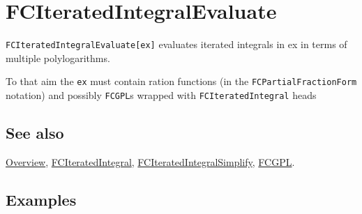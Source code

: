 \documentclass[../FeynCalcManual.tex]{subfiles}
\begin{document}
\begin{Shaded}
\begin{Highlighting}[]
 
\end{Highlighting}
\end{Shaded}

\hypertarget{fciteratedintegralevaluate}{
\section{FCIteratedIntegralEvaluate}\label{fciteratedintegralevaluate}}

\texttt{FCIteratedIntegralEvaluate[\allowbreak{}ex]} evaluates iterated
integrals in ex in terms of multiple polylogarithms.

To that aim the \texttt{ex} must contain ration functions (in the
\texttt{FCPartialFractionForm} notation) and possibly \texttt{FCGPL}s
wrapped with \texttt{FCIteratedIntegral} heads

\subsection{See also}

\hyperlink{toc}{Overview},
\hyperlink{fciteratedintegral}{FCIteratedIntegral},
\hyperlink{fciteratedintegralsimplify}{FCIteratedIntegralSimplify},
\hyperlink{fcgpl}{FCGPL}.

\subsection{Examples}
\end{document}
